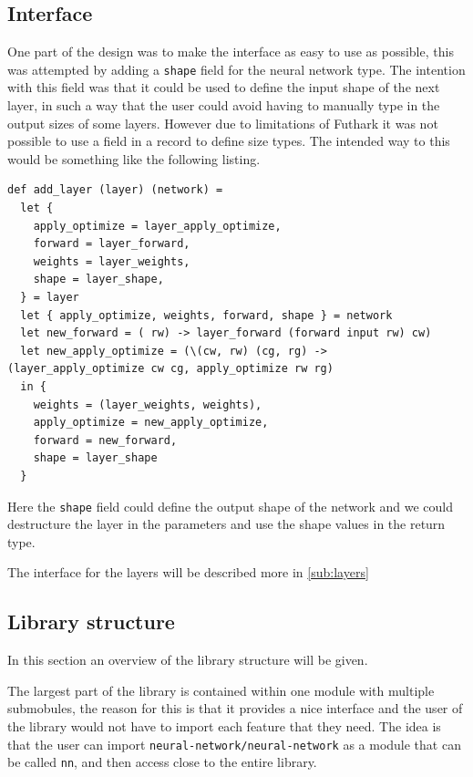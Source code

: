 \subsection{Interface}

One part of the design was to make the interface as easy to use as possible, this was attempted by adding a \texttt{shape} field for the neural network type. The intention with this field was that it could be used to define the input shape of the next layer, in such a way that the user could avoid having to manually type in the output sizes of some layers. However due to limitations of Futhark it was not possible to use a field in a record to define size types. The intended way to this would be something like the following listing.

\begin{lstlisting}[caption=the \texttt{add\_layer} function but with an added field \texttt{shape}.]
def add_layer (layer) (network) =
  let {
    apply_optimize = layer_apply_optimize,
    forward = layer_forward,
    weights = layer_weights,
    shape = layer_shape,
  } = layer
  let { apply_optimize, weights, forward, shape } = network
  let new_forward = ( rw) -> layer_forward (forward input rw) cw)
  let new_apply_optimize = (\(cw, rw) (cg, rg) -> (layer_apply_optimize cw cg, apply_optimize rw rg)
  in {
    weights = (layer_weights, weights),
    apply_optimize = new_apply_optimize,
    forward = new_forward,
    shape = layer_shape
  }
\end{lstlisting}

Here the \texttt{shape} field could define the output shape of the network and we could destructure the layer in the parameters and use the shape values in the return type.

The interface for the layers will be described more in \autoref{sub:layers}

\subsection{Library structure}

In this section an overview of the library structure will be given.

The largest part of the library is contained within one module with multiple submobules, the reason for this is that it provides a nice interface and the user of the library would not have to import each feature that they need.
The idea is that the user can import \texttt{neural-network/neural-network} as a module that can be called \texttt{nn}, and then access close to the entire library.

